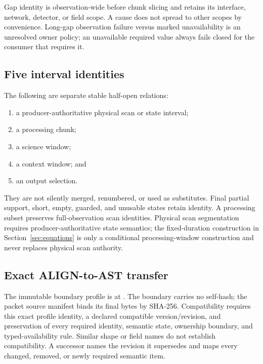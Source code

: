 Gap identity is observation-wide before chunk slicing and retains its
interface, network, detector, or field scope.  A cause does not spread to
other scopes by convenience.  Long-gap observation failure versus marked
unavailability is an unresolved owner policy; an unavailable required value
always fails closed for the consumer that requires it.

\subsection{Five interval identities}

The following are separate stable half-open relations:

\begin{enumerate}
\item a producer-authoritative physical scan or state interval;
\item a processing chunk;
\item a science window;
\item a context window; and
\item an output selection.
\end{enumerate}

They are not silently merged, renumbered, or used as substitutes.  Final
partial support, short, empty, guarded, and unusable states retain identity.
A processing subset preserves full-observation scan identities.  Physical
scan segmentation requires producer-authoritative state semantics; the
fixed-duration construction in Section~\ref{sec:equations} is only a
conditional processing-window construction and never replaces physical scan
authority.

\subsection{Exact ALIGN-to-AST transfer}
\label{sec:ast-boundary}

The immutable boundary profile is
 at .  The boundary carries no
self-hash; the packet source manifest binds its final bytes by SHA-256.
Compatibility requires this exact profile
identity, a declared compatible version/revision, and preservation of every
required identity, semantic state, ownership boundary, and typed-availability
rule.  Similar shape or field names do not establish compatibility.  A
successor names the revision it supersedes and maps every changed, removed, or
newly required semantic item.

